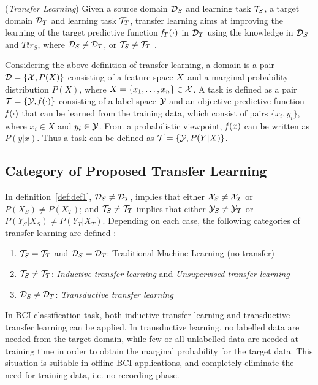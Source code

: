 \begin{defn}(\emph{Transfer Learning})
\label{def:def1}
Given a source domain $\mathcal{D}_S$ and learning task $\mathcal{T}_S$, a target domain $\mathcal{D}_T$ and learning task $\mathcal{T}_T$, transfer learning aims at improving the learning of the target predictive function $\mathit{f}_T(\cdot)$ in $\mathcal{D}_T$ using the knowledge in $\mathcal{D}_S$ and $Ttr_S$, where $\mathcal{D}_S \neq \mathcal{D}_T$, or $\mathcal{T}_S \neq \mathcal{T}_T$ \citep{pan_survey_2010}.
\end{defn}

Considering the above definition of transfer learning, a domain is a pair $\mathcal{D} = \{\mathcal{X}, P(X)\}$ consisting of a feature space $X$ and a marginal probability distribution $P(X)$, where $X = \{x_1, \dots, x_n\} \in \mathcal{X}$. 
A task is defined as a pair $\mathcal{T} = \{\mathcal{Y},\mathit{f}(\cdot)\}$ consisting of a label space $\mathcal{Y}$ and an objective predictive function $\mathit{f}(\cdot)$ that can be learned from the training data, which consist of pairs $\{x_i, y_i\}$, where $x_i \in X$ and $y_i \in \mathcal{Y}$. From a probabilistic viewpoint, $\mathit{f}(x)$ can be written as $P(y|x)$. Thus a task can be defined as $\mathcal{T} = \{\mathcal{Y},P(Y|X)\}$. 
 
\subsection{Category of Proposed Transfer Learning} 
\label{subsec:transfer-learning-category}

In definition~\ref{def:def1}, $\mathcal{D}_S \neq \mathcal{D}_T$, implies that either $\mathcal{X}_S \neq \mathcal{X}_T$ or $P(X_S) \neq P(X_T)$; and $\mathcal{T}_S \neq \mathcal{T}_T$ implies that either $\mathcal{Y}_S \neq \mathcal{Y}_T$ or $P(Y_S|X_S) \neq P(Y_T|X_T)$.
Depending on each case, the following categories of transfer learning are defined \citep{pan_survey_2010}: 
\begin{enumerate}
\item $\mathcal{T}_S = \mathcal{T}_T$ and $\mathcal{D}_S = \mathcal{D}_T$: Traditional Machine Learning (no transfer)
\item $\mathcal{T}_S \neq \mathcal{T}_T$: \emph{Inductive transfer learning} and \emph{Unsupervised transfer learning}
\item $\mathcal{D}_S \neq \mathcal{D}_T$: \emph{Transductive transfer learning}  
\end{enumerate}

In BCI classification task, both inductive transfer learning and transductive transfer learning can be applied.
In transductive learning, no labelled data are needed from the target domain, while few or all unlabelled data are needed at training time in order to obtain the marginal probability for the target data. 
This situation is suitable in offline BCI applications, and completely eliminate the need for training data, i.e. no recording phase.

